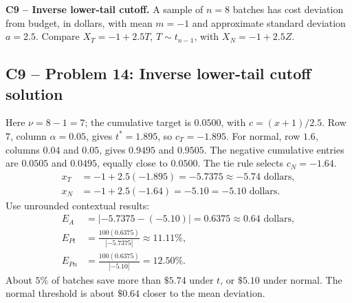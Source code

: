 {
\textbf{C9 -- Inverse lower-tail cutoff.} A sample of $n=8$ batches has cost deviation from budget, in dollars, with mean $m=-1$ and approximate standard deviation $a=2.5$. Compare $X_T=-1+2.5T$, $T\sim t_{n-1}$, with $X_N=-1+2.5Z$.
\label{sol:q14}
\subsection*{C9 -- Problem 14: Inverse lower-tail cutoff solution }
Here $\nu=8-1=7$; the cumulative target is $0.0500$, with $c=(x+1)/2.5$.
Row $7$, column $\alpha=0.05$, gives $t^*=1.895$, so $c_T=-1.895$.
For normal, row $1.6$, columns $0.04$ and $0.05$, gives $0.9495$ and $0.9505$.
The negative cumulative entries are $0.0505$ and $0.0495$, equally close to $0.0500$.
The tie rule selects $c_N=-1.64$.
\[
 \begin{aligned}
 x_T&=-1+2.5(-1.895)=-5.7375\approx\boxed{-5.74\text{ dollars}},\\
 x_N&=-1+2.5(-1.64)=-5.10=\boxed{-5.10\text{ dollars}}.
 \end{aligned}
\]
Use unrounded contextual results:
\[
 \begin{aligned}
 E_A&=|-5.7375-(-5.10)|=0.6375\approx\boxed{0.64\text{ dollars}},\\
 E_{Pt}&=\frac{100(0.6375)}{|-5.7375|}\approx\boxed{11.11\%},\\
 E_{Pn}&=\frac{100(0.6375)}{|-5.10|}=\boxed{12.50\%}.
 \end{aligned}
\]
About $5\%$ of batches save more than $\$5.74$ under $t$, or $\$5.10$ under normal.
The normal threshold is about $\$0.64$ closer to the mean deviation.
\secInicio[sec:q14]
}

